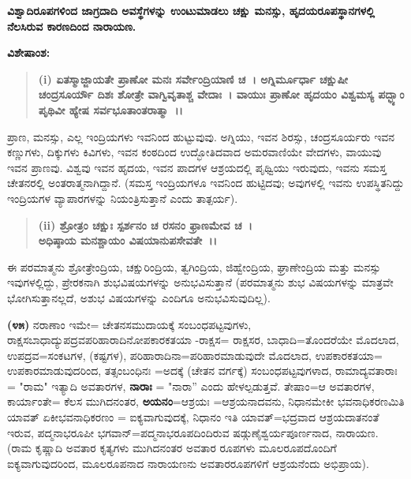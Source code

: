 \begin{center}
\textbf{ವಿಶ್ವಾದಿರೂಪಗಳಿಂದ ಜಾಗ್ರದಾದಿ ಅವಸ್ಥೆಗಳನ್ನು ಉಂಟುಮಾಡಲು ಚಕ್ಷು ಮನಸ್ಸು, ಹೃದಯರೂಪಸ್ಥಾನಗಳಲ್ಲಿ ನೆಲಸಿರುವ ಕಾರಣದಿಂದ ನಾರಾಯಣ.}
\end{center}

\noindent
\textbf{ವಿಶೇಷಾಂಶ:\enginline{-}}

\begin{verse}
\textbf{(i) ಏತಸ್ಮಾಜ್ಜಾಯತೇ ಪ್ರಾಣೋ ಮನಃ ಸರ್ವೇಂದ್ರಿಯಾಣಿ ಚ~। ಅಗ್ನಿರ್ಮೂರ್ಧಾ ಚಕ್ಷುಷೀ ಚಂದ್ರಸೂರ್ಯೌ ದಿಶಃ ಶೋತ್ರೇ ವಾಗ್ವಿವೃತಾಶ್ಚ ವೇದಾಃ~। ವಾಯುಃ ಪ್ರಾಣೋ ಹೃದಯಂ ವಿಶ್ವಮಸ್ಯ ಪದ್ಭ್ಯಾಂ ಪೃಥಿವೀ ಹ್ಯೇಷ ಸರ್ವಭೂತಾಂತರಾತ್ಮಾ~।।}
\end{verse}


ಪ್ರಾಣ, ಮನಸ್ಸು, ಎಲ್ಲ ಇಂದ್ರಿಯಗಳು ಇವನಿಂದ ಹುಟ್ಟುವುವು. ಅಗ್ನಿಯು, ಇವನ ಶಿರಸ್ಸು, ಚಂದ್ರಸೂರ್ಯರು ಇವನ ಕಣ್ಣುಗಳು, ದಿಕ್ಕುಗಳು ಕಿವಿಗಳು, ಇವನ ಕಂಠದಿಂದ ಉದ್ಭೋತಿದವಾದ ಅಮರವಾಣಿಯೇ ವೇದಗಳು, ವಾಯುವು ಇವನ ಪ್ರಾಣವು. ವಿಶ್ವವು ಇವನ ಹೃದಯ, ಇವನ ಪಾದಗಳ ಆಶ್ರಯದಲ್ಲಿ ಪೃಥ್ವಿಯು ಇರುವುದು, ಇವನು ಸಮಸ್ತ ಚೇತನರಲ್ಲಿ ಅಂತರಾತ್ಮನಾಗಿದ್ದಾನೆ. (ಸಮಸ್ತ ಇಂದ್ರಿಯಗಳೂ ಇವನಿಂದ ಹುಟ್ಟಿದವು; ಅವುಗಳಲ್ಲಿ ಇವನು ಉಪಸ್ಥಿತನಿದ್ದು ಇಂದ್ರಿಯಗಳ ವ್ಯಾಪಾರಗಳನ್ನು ನಿಯಂತ್ರಿಸುತ್ತಾನೆ ಎಂದು ತಾತ್ಪರ್ಯ).

\begin{verse}
\textbf{(ii) ಶ್ರೋತ್ರಂ ಚಕ್ಷುಃ ಸ್ಪರ್ಶನಂ ಚ ರಸನಂ ಫ್ರಾಣಮೇವ ಚ~।}\\\textbf{ಅಧಿಷ್ಠಾಯ ಮನಶ್ಚಾಯಂ ವಿಷಯಾನುಪಸೇವತೇ~।।}
\end{verse}


ಈ ಪರಮಾತ್ಮನು ಶ್ರೋತ್ರೇಂದ್ರಿಯ, ಚಕ್ಷುರಿಂದ್ರಿಯ, ತ್ವಗಿಂದ್ರಿಯ, ಜಿಹ್ವೇಂದ್ರಿಯ, ಘ್ರಾಣೇಂದ್ರಿಯ ಮತ್ತು ಮನಸ್ಸು ಇವುಗಳಲ್ಲಿದ್ದು, ಪ್ರೇರಕನಾಗಿ ಶುಭವಿಷಯಗಳನ್ನು ಅನುಭವಿಸುತ್ತಾನೆ (ಪರಮಾತ್ಮನು ಶುಭ ವಿಷಯಗಳನ್ನು ಮಾತ್ರವೇ ಭೋಗಿಸುತ್ತಾನಲ್ಲದೆ, ಅಶುಭ ವಿಷಯಗಳನ್ನು ಎಂದಿಗೂ ಅನುಭವಿಸುವುದಿಲ್ಲ).

\textbf{(೪೫)} ನರಾಣಾಂ ಇಮೇ= ಚೇತನಸಮುದಾಯಕ್ಕೆ ಸಂಬಂಧಪಟ್ಟವುಗಳು, ರಾಕ್ಷಸ\-ಬಾಧಾದ್ಯುಪದ್ರವಪರಿಹಾರಾದಿನೋಪಕಾರಕತಯಾ -ರಾಕ್ಷಸ= ರಾಕ್ಷಸರ, ಬಾಧಾದಿ=\break ತೊಂದರೆಯೇ ಮೊದಲಾದ, ಉಪದ್ರವ=ಸಂಕಟಗಳ, (ಕಷ್ಟಗಳ), ಪರಿಹಾರಾದಿನಾ=ಪರಿಹಾರ\-ಮಾಡುವುದೇ ಮೊದಲಾದ, ಉಪಕಾರಕತಯಾ= ಉಪಕಾರಮಾಡುವುದರಿಂದ, ತತ್ಸಂಬಂಧಿನಃ =ಅದಕ್ಕೆ (ಚೇತನ ವರ್ಗಕ್ಕೆ) ಸಂಬಂಧಪಟ್ಟವುಗಳಾದ, ರಾಮಾದ್ಯವತಾರಾಃ = "ರಾಮ" ಇತ್ಯಾದಿ ಅವತಾರಗಳ, \textbf{ನಾರಾಃ} = "ನಾರಾ'' ಎಂದು ಹೇಳಲ್ಪಡುತ್ತವೆ. ತೇಷಾಂ=ಆ ಅವತಾರಗಳ, ಕಾರ್ಯಾಂತೇ= ಕೆಲಸ ಮುಗಿದನಂತರ, \textbf{ಅಯನಂ}=ಆಶ್ರಯಃ =ಆಶ್ರಯನಾದವನು, ನಿಧಾನಮೇಕೀ ಭವನಾಧಿಕರಣಮಿತಿ ಯಾವತ್‌ ಏಕೀಭವನಾಧಿಕರಣಂ = ಐಕ್ಯವಾಗುವುದಕ್ಕೆ, ನಿಧಾನಂ ಇತಿ ಯಾವತ್=ಭದ್ರವಾದ ಆಶ್ರಯದಾತನಂತೆ ಇರುವ, ಪದ್ಮನಾಭರೂಪೀ ಭಗವಾನ್=ಪದ್ಮನಾಭರೂಪದಿಂದಿರುವ ಷಡ್ಗುಣೈಶ್ವರ್ಯಪೂರ್ಣನಾದ, ನಾರಾಯಣ. (ರಾಮ ಕೃಷ್ಣಾದಿ ಅವತಾರ ಕೃತ್ಯಗಳು ಮುಗಿದನಂತರ ಅವತಾರ ರೂಪಗಳು ಮೂಲರೂಪದೊಂದಿಗೆ ಐಕ್ಯವಾಗುವುದರಿಂದ, ಮೂಲರೂಪನಾದ ನಾರಾಯಣನು ಅವತಾರರೂಪಗಳಿಗೆ ಆಶ್ರಯನೆಂದು ಅಭಿಪ್ರಾಯ).

